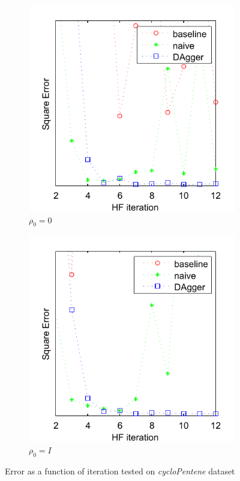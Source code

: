 \documentclass[twoside,11pt]{article}
\begin{document}
\begin{figure}[h!]
\centering
\begin{subfigure}{.5\textwidth}
  \centering
  \includegraphics[scale=0.7]{cycloPen_pzero_test_12iter_naive.pdf}
  \caption{$\rho_0 = 0$}
  \label{fig:cycloPen0}
\end{subfigure}%
\begin{subfigure}{.5\textwidth}
  \centering
  \includegraphics[scale=0.7]{cycloPen_peye_test_12iter_naive.pdf}
  \caption{$\rho_0 = I$}
  \label{fig:cycloPenI}
\end{subfigure}
\caption{Error as a function of iteration tested on \textit{cycloPentene} dataset}
\label{fig:testcycloPen}
\end{figure}
\end{document}
